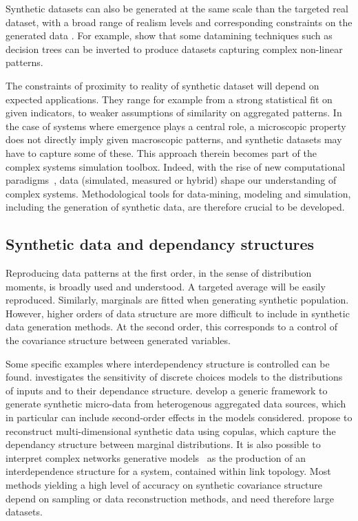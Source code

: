 \documentclass{article}
\begin{document}
Synthetic datasets can also be generated at the same scale than the targeted real dataset, with a broad range of realism levels and corresponding constraints on the generated data \cite{hoag2008synthetic}. For example, \cite{eno2008generating} show that some datamining techniques such as decision trees can be inverted to produce datasets capturing complex non-linear patterns.

The constraints of proximity to reality of synthetic dataset will depend on expected applications. They range for example from a strong statistical fit on given indicators, to weaker assumptions of similarity on aggregated patterns. In the case of systems where emergence plays a central role, a microscopic property does not directly imply given macroscopic patterns, and synthetic datasets may have to capture some of these. This approach therein becomes part of the complex systems simulation toolbox. Indeed, with the rise of new computational paradigms~\cite{arthur2015complexity}, data (simulated, measured or hybrid) shape our understanding of complex systems. Methodological tools for data-mining, modeling and simulation, including the generation of synthetic data, are therefore crucial to be developed.



\subsection*{Synthetic data and dependancy structures}

Reproducing data patterns at the first order, in the sense of distribution moments, is broadly used and understood. A targeted average will be easily reproduced. Similarly, marginals are fitted when generating synthetic population. However, higher orders of data structure are more difficult to include in synthetic data generation methods. At the second order, this corresponds to a control of the covariance structure between generated variables.

Some specific examples where interdependency structure is controlled can be found. \cite{ye2011investigation} investigates the sensitivity of discrete choices models to the distributions of inputs and to their dependance structure. \cite{birkin1988synthesis} develop a generic framework to generate synthetic micro-data from heterogenous aggregated data sources, which in particular can include second-order effects in the models considered. \cite{li2014differentially} propose to reconstruct multi-dimensional synthetic data using copulas, which capture the dependancy structure between marginal distributions. It is also possible to interpret complex networks generative models~\cite{newman2003structure} as the production of an interdependence structure for a system, contained within link topology. Most methods yielding a high level of accuracy on synthetic covariance structure depend on sampling or data reconstruction methods, and need therefore large datasets.
\end{document}
